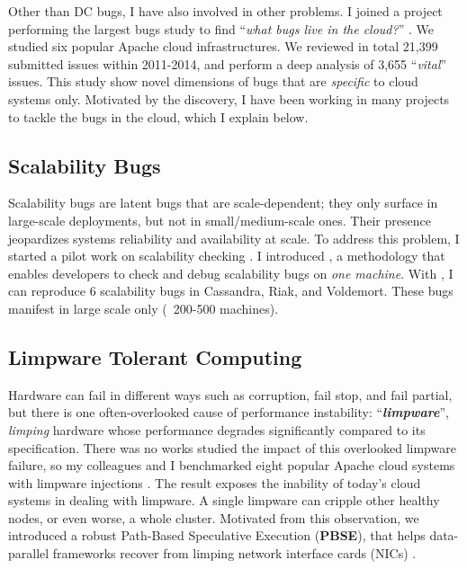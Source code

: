 \documentclass[11pt]{article}
\begin{document}
Other than DC bugs, I have also involved in other problems. I
joined a project performing the largest bugs study to find ``\textit{what bugs
live in the cloud?}'' \cite{Gunawi+14-Cbs}.  We studied six popular Apache
cloud infrastructures. We
reviewed in total 21,399 submitted issues within 2011-2014, and perform a deep
analysis of 3,655 ``\textit{vital}'' issues. This study show novel dimensions
of bugs that are \textit{specific} to cloud systems only. Motivated by the
discovery, I have been working in many projects to tackle the bugs in the
cloud, which I explain below.

\subsection{Scalability Bugs}

Scalability bugs are latent bugs that are scale-dependent; they only surface in
large-scale deployments, but not in small/medium-scale ones. Their presence
jeopardizes systems reliability and availability at scale. 
%
To address this problem, I started a pilot work on scalability checking
\cite{Gunawi+17-ScaleCheck-Insub}. I introduced \sck, a methodology that enables
developers to check and debug scalability bugs on \textit{one machine}. With
\sck, I can reproduce 6 scalability bugs in Cassandra, Riak, and Voldemort.
These bugs manifest in large scale only (\eg\ 200-500 machines). 

\subsection{Limpware Tolerant Computing}

Hardware can fail in different ways such as corruption, fail stop, and fail
partial, but there is one often-overlooked cause of performance instability:
``\textbf{\textit{limpware}}'', \textit{limping} hardware whose performance
degrades significantly compared to its specification.  There was no works
studied the impact of this overlooked limpware failure, so my colleagues and I
benchmarked eight popular Apache cloud systems with limpware injections
\cite{Do+13-Limplock}. The result exposes the inability of today's cloud
systems in dealing with limpware. A single limpware can cripple other healthy
nodes, or even worse, a whole cluster.  Motivated from this observation, we
introduced a robust Path-Based Speculative Execution (\textbf{PBSE}), that
helps data-parallel frameworks recover from limping network interface cards (NICs)
\cite{Suminto+17-PBSE-InSub}.
\end{document}
